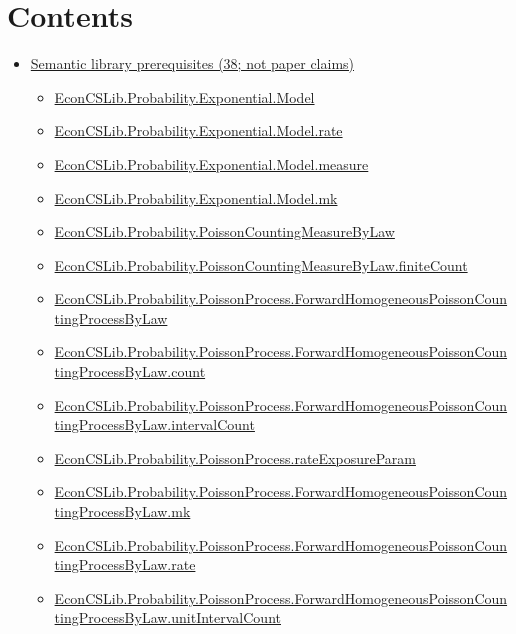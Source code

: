 \documentclass[10pt]{article}
\begin{document}
\section*{Contents}
\begin{itemize}[leftmargin=1.2em]
\item \hyperlink{library-section-378529c53c19af58}{Semantic library prerequisites (38; not paper claims)}
\begin{itemize}[leftmargin=1.2em]
\item \hyperlink{library-prerequisite-00608e839979428a}{EconCSLib.Probability.Exponential.Model}
\item \hyperlink{library-prerequisite-ebd02d956f133ba1}{EconCSLib.Probability.Exponential.Model.rate}
\item \hyperlink{library-prerequisite-46315b27c25dd5ba}{EconCSLib.Probability.Exponential.Model.measure}
\item \hyperlink{library-prerequisite-f979086662c1cf00}{EconCSLib.Probability.Exponential.Model.mk}
\item \hyperlink{library-prerequisite-d9772f4ff2196441}{EconCSLib.Probability.PoissonCountingMeasureByLaw}
\item \hyperlink{library-prerequisite-d8f178573be34804}{EconCSLib.Probability.PoissonCountingMeasureByLaw.finiteCount}
\item \hyperlink{library-prerequisite-3670bfce1c6898f0}{EconCSLib.Probability.PoissonProcess.ForwardHomogeneousPoissonCountingProcessByLaw}
\item \hyperlink{library-prerequisite-f7e7f9bf08c14b22}{EconCSLib.Probability.PoissonProcess.ForwardHomogeneousPoissonCountingProcessByLaw.count}
\item \hyperlink{library-prerequisite-bcb83553a4d36068}{EconCSLib.Probability.PoissonProcess.ForwardHomogeneousPoissonCountingProcessByLaw.intervalCount}
\item \hyperlink{library-prerequisite-1aeb2cc0b5720b0f}{EconCSLib.Probability.PoissonProcess.rateExposureParam}
\item \hyperlink{library-prerequisite-611739d9b580e04d}{EconCSLib.Probability.PoissonProcess.ForwardHomogeneousPoissonCountingProcessByLaw.mk}
\item \hyperlink{library-prerequisite-fdbae66a199bc85c}{EconCSLib.Probability.PoissonProcess.ForwardHomogeneousPoissonCountingProcessByLaw.rate}
\item \hyperlink{library-prerequisite-0b63c504abe95dc8}{EconCSLib.Probability.PoissonProcess.ForwardHomogeneousPoissonCountingProcessByLaw.unitIntervalCount}

\end{itemize}
\end{itemize}
\end{document}
